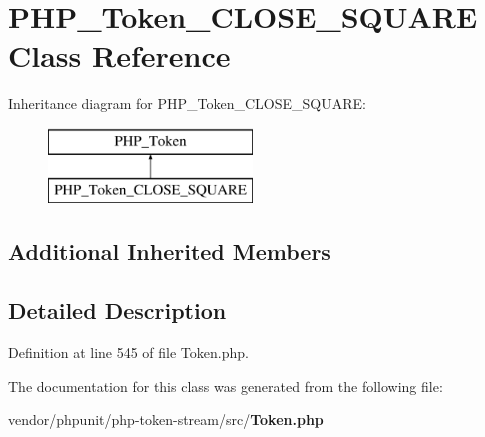 \section{P\+H\+P\+\_\+\+Token\+\_\+\+C\+L\+O\+S\+E\+\_\+\+S\+Q\+U\+A\+R\+E Class Reference}
\label{class_p_h_p___token___c_l_o_s_e___s_q_u_a_r_e}
Inheritance diagram for P\+H\+P\+\_\+\+Token\+\_\+\+C\+L\+O\+S\+E\+\_\+\+S\+Q\+U\+A\+R\+E\+:\begin{figure}[H]
\begin{center}
\leavevmode
\includegraphics[height=2.000000cm]{class_p_h_p___token___c_l_o_s_e___s_q_u_a_r_e}
\end{center}
\end{figure}
\subsection*{Additional Inherited Members}


\subsection{Detailed Description}


Definition at line 545 of file Token.\+php.



The documentation for this class was generated from the following file\+:\begin{DoxyCompactItemize}
\item 
vendor/phpunit/php-\/token-\/stream/src/{\bf Token.\+php}\end{DoxyCompactItemize}
